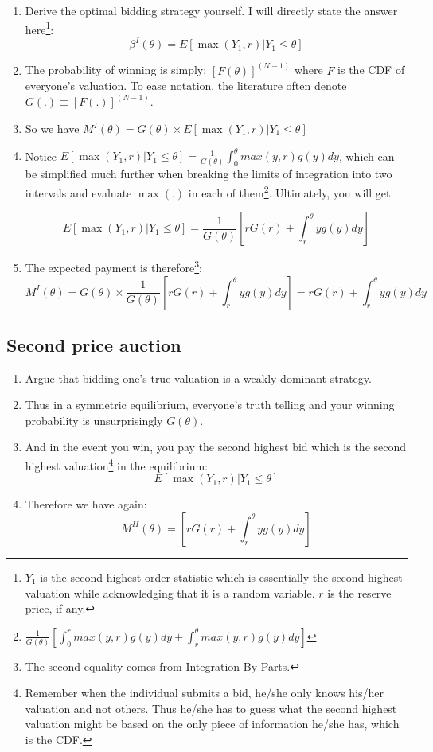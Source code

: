 \documentclass{tufte-handout}
\begin{document}
\begin{enumerate}
    
    \item Derive the optimal bidding strategy yourself. I will directly state the answer here\footnote{$Y_1$ is the second highest order statistic which is essentially the second highest valuation while acknowledging that it is a random variable. $r$ is the reserve price, if any.}: $$\beta^I(\theta) = E\left[ \max \left(Y_1, r \right) | Y_1 \leq \theta \right]$$

    \item The probability of winning is simply: $[F(\theta)]^{(N-1)}$ where $F$ is the CDF of everyone's valuation. To ease notation, the literature often denote $G(.) \equiv [F(.)]^{(N-1)}$.
    
    \item So we have $M^I(\theta) = G(\theta) \times E\left[ \max \left(Y_1, r \right) | Y_1 \leq \theta \right]$
    
    \item Notice $E\left[ \max \left(Y_1, r \right) | Y_1 \leq \theta \right] = \frac{1}{G(\theta)}\int_0^\theta max(y, r) g(y) dy$, which can be simplified much further when breaking the limits of integration into two intervals and evaluate $\max(.)$ in each of them\footnote{$\frac{1}{G(\theta)} \left[ \int_0^r max(y, r) g(y) dy + \int_r^\theta max(y, r) g(y) dy \right]$}. Ultimately, you will get:
    
    $$E\left[ \max \left(Y_1, r \right) | Y_1 \leq \theta \right] = \frac{1}{G(\theta)}\left[ rG(r) + \int_r^\theta y g(y) dy \right]$$
    
    \item The expected payment is therefore\footnote{The second equality comes from Integration By Parts.}:
    $$M^I(\theta) = G(\theta) \times \frac{1}{G(\theta)}\left[ rG(r) + \int_r^\theta y g(y) dy \right] = rG(r) + \int_r^\theta y g(y) dy$$
    
\end{enumerate}
\newpage


\subsection{Second price auction}
\begin{enumerate}
    \item Argue that bidding one's true valuation is a weakly dominant strategy.
    \item Thus in a symmetric equilibrium, everyone's truth telling and your winning probability is unsurprisingly $G(\theta)$.
    \item And in the event you win, you pay the second highest bid which is the second highest valuation\footnote{Remember when the individual submits a bid, he/she only knows his/her valuation and not others. Thus he/she has to guess what the second highest valuation might be based on the only piece of information he/she has, which is the CDF.} in the equilibrium: $$E\left[ \max \left(Y_1, r \right) | Y_1 \leq \theta \right]$$
    \item Therefore we have again:
    $$M^{II}(\theta) = \left[ rG(r) + \int_r^\theta y g(y) dy \right]$$
\end{enumerate}
\end{document}
